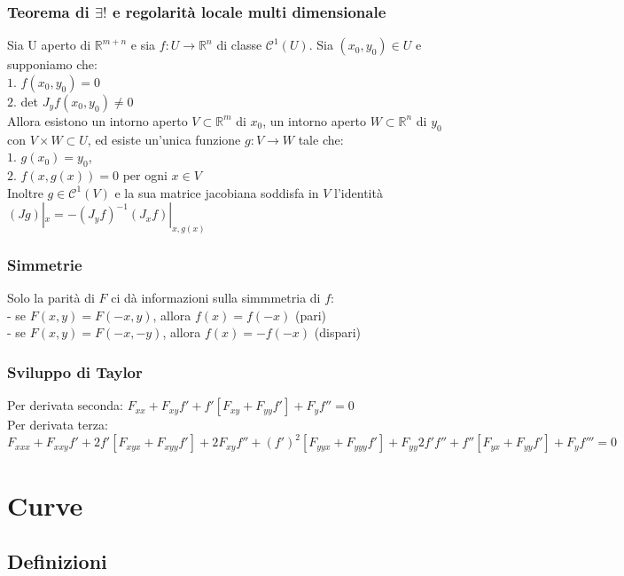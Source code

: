 \documentclass{article} %
\begin{document}
    \subsubsection*{Teorema di $\exists !$ e regolarità locale multi dimensionale}
    Sia U aperto di $\mathbb{R}^{m+n}$ e sia $f:U \to \mathbb{R}^n$ di classe $\mathcal{C}^1\left(U\right)$. Sia $(x_0,y_0) \in U$ e supponiamo che: \\
    $1.$ $f(x_0,y_0)=0$ \\
    $2.$ det $J_{y}f(x_0,y_0) \neq 0$ \\
    Allora esistono un intorno aperto $V \subset \mathbb{R}^m$ di $x_0$, un intorno aperto $W \subset \mathbb{R}^n$ di $y_0$ con $V \times W \subset U$, ed esiste un'unica funzione $g: V \to W$ tale che: \\
    $1.$ $g(x_0)=y_0$, \\
    $2.$ $f(x,g(x))=0$ per ogni $x \in V$ \\
    Inoltre $g \in \mathcal{C}^1(V)$ e la sua matrice jacobiana soddisfa in $V$ l'identità \\
    $(Jg)|_x = -(J_yf)^{-1}(J_xf)|_{x,g(x)}$ 

    \subsubsection*{Simmetrie}
    Solo la parità di $F$ ci dà informazioni sulla simmmetria di $f$: \\
    - se $F(x,y)=F(-x,y)$, allora $f(x)=f(-x)$ (pari)  \\
    - se $F(x,y)=F(-x,-y)$, allora $f(x)=-f(-x)$ (dispari)

    \subsubsection*{Sviluppo di Taylor}
    Per derivata seconda: $F_{xx} + F_{xy} f' + f' [F_{xy} + F_{yy} f'] + F_y f'' = 0$ \\
    Per derivata terza: $F_{xxx}+F_{xxy}f' + 2 f' [F_{xyx}+F_{xyy}f']+2F_{xy}f''+(f')^2[F_{yyx}+F_{yyy}f']+F_{yy}2 f' f'' + f''[F_{yx}+F_{yy}f']+F_yf'''=0$



    \section{Curve}
    \subsection{Definizioni}
\end{document}
